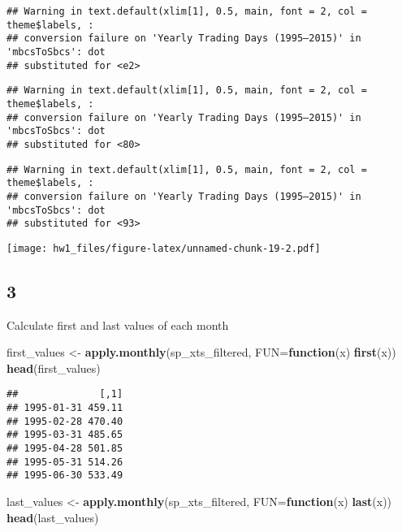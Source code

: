 \documentclass[
]{article}
\newenvironment{Shaded}{\begin{snugshade}}{\end{snugshade}}
\newcommand{\AttributeTok}[1]{\textcolor[rgb]{0.13,0.29,0.53}{#1}}
\newcommand{\ControlFlowTok}[1]{\textcolor[rgb]{0.13,0.29,0.53}{\textbf{#1}}}
\newcommand{\FunctionTok}[1]{\textcolor[rgb]{0.13,0.29,0.53}{\textbf{#1}}}
\newcommand{\NormalTok}[1]{#1}
\newcommand{\OtherTok}[1]{\textcolor[rgb]{0.56,0.35,0.01}{#1}}
\begin{document}
\begin{verbatim}
## Warning in text.default(xlim[1], 0.5, main, font = 2, col = theme$labels, :
## conversion failure on 'Yearly Trading Days (1995–2015)' in 'mbcsToSbcs': dot
## substituted for <e2>
\end{verbatim}

\begin{verbatim}
## Warning in text.default(xlim[1], 0.5, main, font = 2, col = theme$labels, :
## conversion failure on 'Yearly Trading Days (1995–2015)' in 'mbcsToSbcs': dot
## substituted for <80>
\end{verbatim}

\begin{verbatim}
## Warning in text.default(xlim[1], 0.5, main, font = 2, col = theme$labels, :
## conversion failure on 'Yearly Trading Days (1995–2015)' in 'mbcsToSbcs': dot
## substituted for <93>
\end{verbatim}

\texttt{[image: hw1\_files/figure-latex/unnamed-chunk-19-2.pdf]}

\subsection{3}\label{section-2}

Calculate first and last values of each month

\begin{Shaded}
\begin{Highlighting}[]
\NormalTok{first\_values }\OtherTok{\textless{}{-}} \FunctionTok{apply.monthly}\NormalTok{(sp\_xts\_filtered, }\AttributeTok{FUN=}\ControlFlowTok{function}\NormalTok{(x) }\FunctionTok{first}\NormalTok{(x))}
\FunctionTok{head}\NormalTok{(first\_values)}
\end{Highlighting}
\end{Shaded}

\begin{verbatim}
##              [,1]
## 1995-01-31 459.11
## 1995-02-28 470.40
## 1995-03-31 485.65
## 1995-04-28 501.85
## 1995-05-31 514.26
## 1995-06-30 533.49
\end{verbatim}

\begin{Shaded}
\begin{Highlighting}[]
\NormalTok{last\_values }\OtherTok{\textless{}{-}} \FunctionTok{apply.monthly}\NormalTok{(sp\_xts\_filtered, }\AttributeTok{FUN=}\ControlFlowTok{function}\NormalTok{(x) }\FunctionTok{last}\NormalTok{(x))}
\FunctionTok{head}\NormalTok{(last\_values)}
\end{Highlighting}
\end{Shaded}
\end{document}
